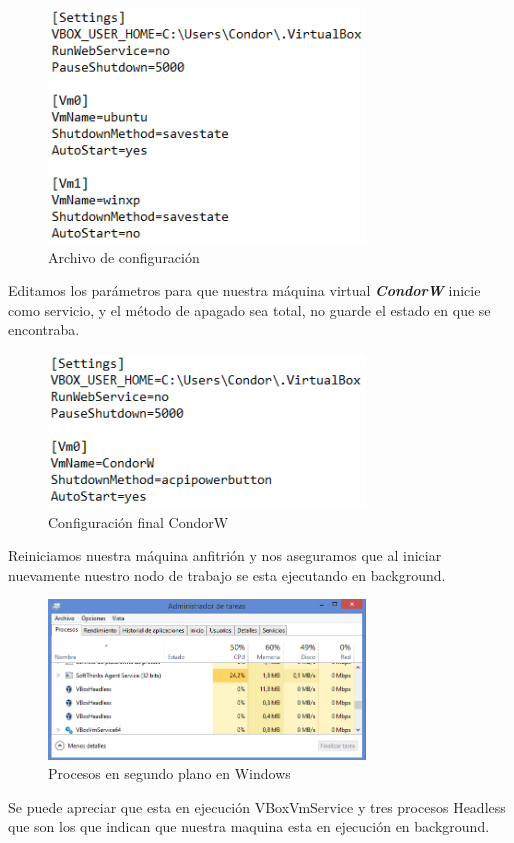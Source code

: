 \begin{figure}[h]
\centering
\includegraphics[width=0.75\textwidth]{windows/vmservice.PNG}
\decoRule
\caption{Archivo de configuración}
\label{fig:vms config}
\end{figure}
\FloatBarrier

Editamos los parámetros para que nuestra máquina virtual \textbf{\textit{CondorW}} inicie como servicio, y el método de apagado sea total, no guarde el estado en que se encontraba.

\begin{figure}[h]
\centering
\includegraphics[width=0.75\textwidth]{windows/condorw.PNG}
\decoRule
\caption{Configuración final CondorW}
\label{fig:vms final}
\end{figure}
\FloatBarrier

Reiniciamos nuestra máquina anfitrión y nos aseguramos que al iniciar nuevamente nuestro nodo de trabajo se esta ejecutando en background.

\begin{figure}[h]
\centering
\includegraphics[width=0.75\textwidth]{windows/tasks.PNG}
\decoRule
\caption{Procesos en segundo plano en Windows}
\label{fig:task manager}
\end{figure}
\FloatBarrier

Se puede apreciar que esta en ejecución VBoxVmService y tres procesos Headless que son los que indican que nuestra maquina esta en ejecución en background.







